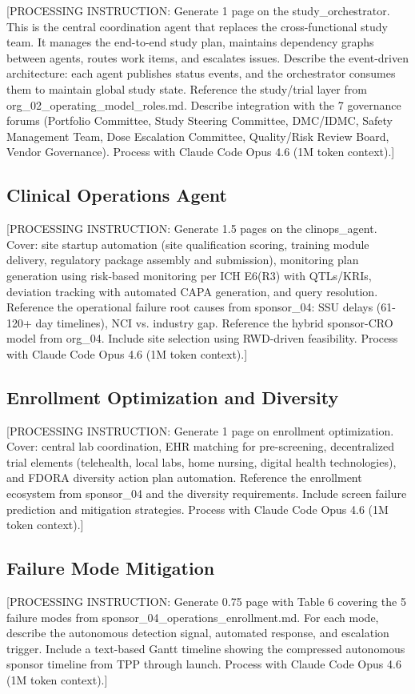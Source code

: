 [PROCESSING INSTRUCTION: Generate 1 page on the study\_orchestrator. This is the central
coordination agent that replaces the cross-functional study team. It manages the end-to-end
study plan, maintains dependency graphs between agents, routes work items, and escalates
issues. Describe the event-driven architecture: each agent publishes status events, and
the orchestrator consumes them to maintain global study state. Reference the study/trial
layer from org\_02\_operating\_model\_roles.md. Describe integration with the 7 governance
forums (Portfolio Committee, Study Steering Committee, DMC/IDMC, Safety Management Team,
Dose Escalation Committee, Quality/Risk Review Board, Vendor Governance).
Process with Claude Code Opus 4.6 (1M token context).]

\subsection{Clinical Operations Agent}

[PROCESSING INSTRUCTION: Generate 1.5 pages on the clinops\_agent. Cover: site startup
automation (site qualification scoring, training module delivery, regulatory package
assembly and submission), monitoring plan generation using risk-based monitoring per
ICH E6(R3) with QTLs/KRIs, deviation tracking with automated CAPA generation, and
query resolution. Reference the operational failure root causes from sponsor\_04:
SSU delays (61-120+ day timelines), NCI vs. industry gap. Reference the hybrid
sponsor-CRO model from org\_04. Include site selection using RWD-driven feasibility.
Process with Claude Code Opus 4.6 (1M token context).]

\subsection{Enrollment Optimization and Diversity}

[PROCESSING INSTRUCTION: Generate 1 page on enrollment optimization. Cover: central lab
coordination, EHR matching for pre-screening, decentralized trial elements (telehealth,
local labs, home nursing, digital health technologies), and FDORA diversity action plan
automation. Reference the enrollment ecosystem from sponsor\_04 and the diversity
requirements. Include screen failure prediction and mitigation strategies.
Process with Claude Code Opus 4.6 (1M token context).]

\subsection{Failure Mode Mitigation}

[PROCESSING INSTRUCTION: Generate 0.75 page with Table 6 covering the 5 failure modes from
sponsor\_04\_operations\_enrollment.md. For each mode, describe the autonomous detection
signal, automated response, and escalation trigger. Include a text-based Gantt timeline
showing the compressed autonomous sponsor timeline from TPP through launch.
Process with Claude Code Opus 4.6 (1M token context).]
